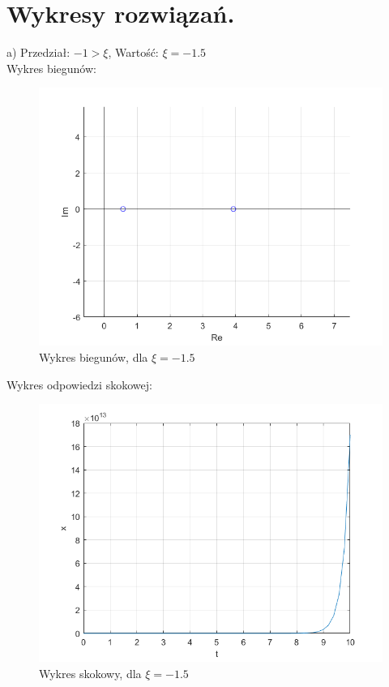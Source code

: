 \documentclass{article}
\begin{document}
\section{Wykresy rozwiązań.}


\begin{flushleft}
 a)  Przedział: $-1>\xi$, Wartość: $\xi=-1.5$\\
 
 
  Wykres biegunów:\\
 \begin{figure}[h!]
    \centering
    \includegraphics[scale=0.6]{bieguny_ksi_-1_5.png}
    \caption{Wykres biegunów, dla $\xi=-1.5$}
    \label{fig:bieguny_ksi_-1_5}
 \end{figure}
 
 
 Wykres odpowiedzi skokowej:\\
 \begin{figure}[h!]
    \centering
    \includegraphics[scale=0.6]{ksi_-1_5.png}
    \caption{Wykres skokowy, dla $\xi=-1.5$}
    \label{fig:ksi_-1_5}
 \end{figure}
 

\end{flushleft}
\end{document}
